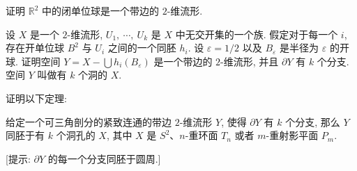 \begin{exercise}
\label{exercise:ch12-sec78-03}
证明 $\mathbb{R}^{2}$ 中的闭单位球是一个带边的 $2$-维流形.
\end{exercise}

\begin{exercise}
\label{exercise:ch12-sec78-04}
设 $X$ 是一个 $2$-维流形, $U_{1},\ \cdots,\ U_{k}$ 是 $X$ 中无交开集的一个族. 假定对于每一个 $i$, 存在开单位球 $B^{2}$ 与 $U_{i}$ 之间的一个同胚 $h_{i}$. 设 $\varepsilon=1/2$ 以及 $B_{\varepsilon}$ 是半径为 $\varepsilon$ 的开球. 证明空间 $Y=X-\bigcup h_{i}(B_{\varepsilon})$ 是一个带边的 $2$-维流形, 并且 $\partial Y$ 有 $k$ 个分支. 空间 $Y$ 叫做有 $k$ 个洞的 $X$.
\end{exercise}

\begin{exercise}
\label{exercise:ch12-sec78-05}
证明以下定理:

\begin{theorem}[带边曲面的分类]
\label{theorem:ch12-bordered-classification}
给定一个可三角剖分的紧致连通的带边 $2$-维流形 $Y$, 使得 $\partial Y$ 有 $k$ 个分支, 那么 $Y$ 同胚于有 $k$ 个洞孔的 $X$, 其中 $X$ 是 $S^{2}$、$n$-重环面 $T_{n}$ 或者 $m$-重射影平面 $P_{m}$.
\end{theorem}
[提示: $\partial Y$ 的每一个分支同胚于圆周.]
\end{exercise}
